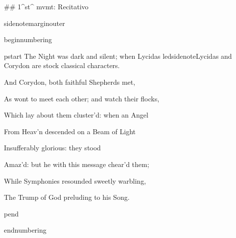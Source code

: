 ## 1^st^ 
mvmt: Recitativo


sidenotemargin{outer}

beginnumbering

pstart
The Night was dark and silent; when Lycidas 
ledsidenote{Lycidas and Corydon are stock classical characters.}

And Corydon, both faithful Shepherds met, 

As wont to meet each other; and watch their flocks, 

Which lay about them cluster’d: when an Angel 

From Heav’n descended on a Beam of Light 

Insufferably glorious: they stood 

Amaz’d: but he with this message chear’d them; 

While Symphonies resounded sweetly warbling, 

The Trump of God preluding to his Song.

pend

endnumbering
